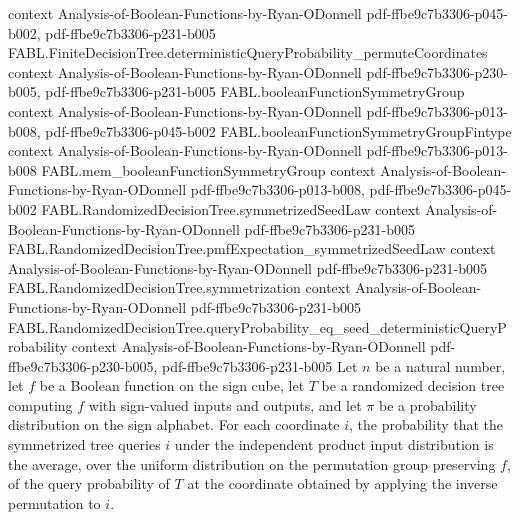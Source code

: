 \begin{theorem}
  {context}
  {Analysis-of-Boolean-Functions-by-Ryan-ODonnell}
  {pdf-ffbe9c7b3306-p045-b002,
    pdf-ffbe9c7b3306-p231-b005}
\proofstep
  {FABL.FiniteDecisionTree.deterministicQueryProbability_permuteCoordinates}
  {context}
  {Analysis-of-Boolean-Functions-by-Ryan-ODonnell}
  {pdf-ffbe9c7b3306-p230-b005,
    pdf-ffbe9c7b3306-p231-b005}
\proofstep
  {FABL.booleanFunctionSymmetryGroup}
  {context}
  {Analysis-of-Boolean-Functions-by-Ryan-ODonnell}
  {pdf-ffbe9c7b3306-p013-b008,
    pdf-ffbe9c7b3306-p045-b002}
\proofstep
  {FABL.booleanFunctionSymmetryGroupFintype}
  {context}
  {Analysis-of-Boolean-Functions-by-Ryan-ODonnell}
  {pdf-ffbe9c7b3306-p013-b008}
\proofstep
  {FABL.mem_booleanFunctionSymmetryGroup}
  {context}
  {Analysis-of-Boolean-Functions-by-Ryan-ODonnell}
  {pdf-ffbe9c7b3306-p013-b008,
    pdf-ffbe9c7b3306-p045-b002}
\proofstep
  {FABL.RandomizedDecisionTree.symmetrizedSeedLaw}
  {context}
  {Analysis-of-Boolean-Functions-by-Ryan-ODonnell}
  {pdf-ffbe9c7b3306-p231-b005}
\proofstep
  {FABL.RandomizedDecisionTree.pmfExpectation_symmetrizedSeedLaw}
  {context}
  {Analysis-of-Boolean-Functions-by-Ryan-ODonnell}
  {pdf-ffbe9c7b3306-p231-b005}
\proofstep
  {FABL.RandomizedDecisionTree.symmetrization}
  {context}
  {Analysis-of-Boolean-Functions-by-Ryan-ODonnell}
  {pdf-ffbe9c7b3306-p231-b005}
\proofstep
  {FABL.RandomizedDecisionTree.queryProbability_eq_seed_deterministicQueryProbability}
  {context}
  {Analysis-of-Boolean-Functions-by-Ryan-ODonnell}
  {pdf-ffbe9c7b3306-p230-b005,
    pdf-ffbe9c7b3306-p231-b005}
Let $n$ be a natural number, let $f$ be a Boolean function on the sign cube, let $T$ be
a randomized decision tree computing $f$ with sign-valued inputs and outputs, and let
$\pi$ be a probability distribution on the sign alphabet. For each coordinate $i$, the
probability that the symmetrized tree queries $i$ under the independent product input
distribution is the average, over the uniform distribution on the permutation group
preserving $f$, of the query probability of $T$ at the coordinate obtained by applying
the inverse permutation to $i$.
\end{theorem}

